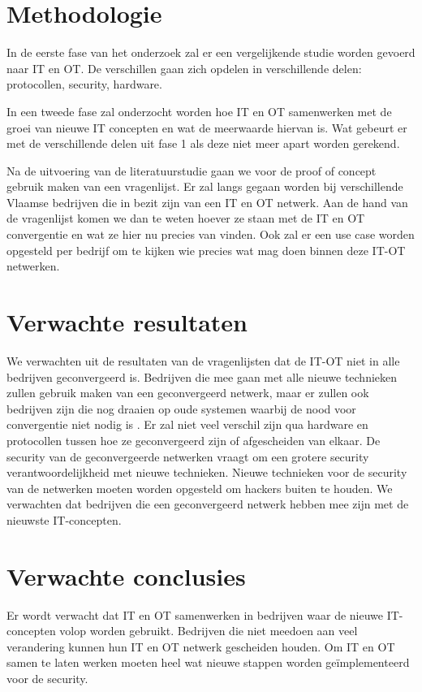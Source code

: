 \section{Methodologie}
\label{sec:methodologie}

In de eerste fase van het onderzoek zal er een vergelijkende studie worden gevoerd naar IT en OT. De verschillen gaan zich opdelen in verschillende delen: protocollen, security, hardware. 


In een tweede fase zal onderzocht worden hoe IT en OT samenwerken met de groei van nieuwe IT concepten en wat de meerwaarde hiervan is. Wat gebeurt er met de verschillende delen uit fase 1 als deze niet meer apart worden gerekend. 


Na de uitvoering van de literatuurstudie gaan we voor de proof of concept gebruik maken van een vragenlijst. Er zal langs gegaan worden bij verschillende Vlaamse bedrijven die in bezit zijn van een IT en OT netwerk. Aan de hand van de vragenlijst komen we dan te weten hoever ze staan met de IT en OT convergentie en wat ze hier nu precies van vinden. Ook zal er een use case worden opgesteld per bedrijf om te kijken wie precies wat mag doen binnen deze IT-OT netwerken. 




\section{Verwachte resultaten}
\label{sec:verwachte_resultaten}

We verwachten uit de resultaten van de vragenlijsten dat de IT-OT niet in alle bedrijven geconvergeerd is. Bedrijven die mee gaan met alle nieuwe technieken zullen gebruik maken van een geconvergeerd netwerk, maar er zullen ook bedrijven zijn die nog draaien op oude systemen waarbij de nood voor convergentie niet nodig is \autocite{Berge2018}. Er zal niet veel verschil zijn qua hardware en protocollen tussen hoe ze geconvergeerd zijn of afgescheiden van elkaar. De security van de geconvergeerde netwerken vraagt om een grotere security verantwoordelijkheid met nieuwe technieken. Nieuwe technieken voor de security van de netwerken moeten worden opgesteld om hackers buiten te houden. We verwachten dat bedrijven die een geconvergeerd netwerk hebben mee zijn met de nieuwste IT-concepten. 


\section{Verwachte conclusies}
\label{sec:verwachte_conclusies}

Er wordt verwacht dat IT en OT samenwerken in bedrijven waar de nieuwe IT-concepten volop worden gebruikt. Bedrijven die niet meedoen aan veel verandering kunnen hun IT en OT netwerk gescheiden houden. Om IT en OT samen te laten werken moeten heel wat nieuwe stappen worden geïmplementeerd voor de security.

